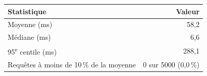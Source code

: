 \begin{tabular}{lr}
\toprule
Statistique & Valeur \\
\midrule
Moyenne (ms) & 58,2 \\
Médiane (ms) & 6,6 \\
95\textsuperscript{e} centile (ms) & 288,1 \\
Requêtes à moins de 10\,\% de la moyenne & 0 sur 5000 (0,0\,\%) \\
\bottomrule
\end{tabular}

